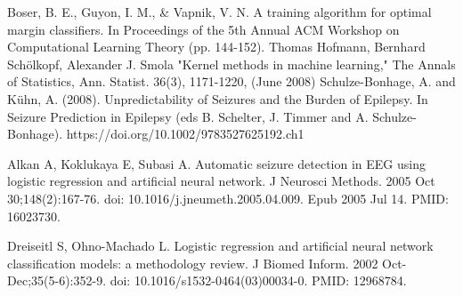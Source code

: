 \documentclass[10pt,twocolumn,letterpaper]{article}
\begin{document}
\begin{thebibliography}{9}
 Boser, B. E., Guyon, I. M., \& Vapnik, V. N. A training algorithm for optimal margin classifiers. In Proceedings of the 5th Annual ACM Workshop on Computational Learning Theory (pp. 144-152).
 Thomas Hofmann, Bernhard Schölkopf, Alexander J. Smola "Kernel methods in machine learning," The Annals of Statistics, Ann. Statist. 36(3), 1171-1220, (June 2008)
 Schulze-Bonhage, A. and Kühn, A. (2008). Unpredictability of Seizures and the Burden of Epilepsy. In Seizure Prediction in Epilepsy (eds B. Schelter, J. Timmer and A. Schulze-Bonhage). https://doi.org/10.1002/9783527625192.ch1

Alkan A, Koklukaya E, Subasi A. Automatic seizure detection in EEG using logistic regression and artificial neural network. J Neurosci Methods. 2005 Oct 30;148(2):167-76. doi: 10.1016/j.jneumeth.2005.04.009. Epub 2005 Jul 14. PMID: 16023730.

Dreiseitl S, Ohno-Machado L. Logistic regression and artificial neural network classification models: a methodology review. J Biomed Inform. 2002 Oct-Dec;35(5-6):352-9. doi: 10.1016/s1532-0464(03)00034-0. PMID: 12968784.

\end{thebibliography}

\clearpage

\end{document}
